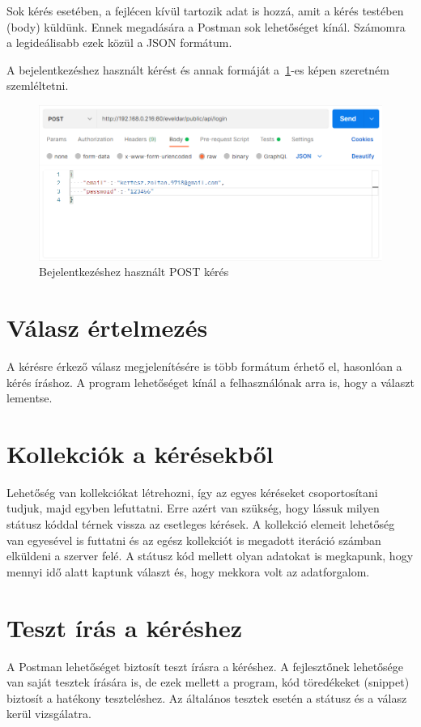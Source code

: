 \documentclass[
]{thesis-ekf}
\theoremstyle{definition}
\theoremstyle{remark}
\begin{document}
	Sok kérés esetében, a fejlécen kívül tartozik adat is hozzá, amit a kérés testében (body) küldünk. Ennek megadására a Postman sok lehetőséget kínál. Számomra a legideálisabb ezek közül a JSON formátum. 
	
	A bejelentkezéshez használt kérést és annak formáját a~\ref{figure:postman_login}-es képen szeretném szemléltetni. 
	
	\begin{figure}[ht!]
		\centering
		\includegraphics[width=1\textwidth]{postman/login_post}
		\caption{Bejelentkezéshez használt POST kérés}
		\label{figure:postman_login}
	\end{figure}
	
	\section{Válasz értelmezés}
	A kérésre érkező válasz megjelenítésére is több formátum érhető el, hasonlóan a kérés íráshoz. A program lehetőséget kínál a felhasználónak arra is, hogy a választ lementse.
	
	\section{Kollekciók a kérésekből}
	Lehetőség van kollekciókat létrehozni, így az egyes kéréseket csoportosítani tudjuk, majd egyben lefuttatni. Erre azért van szükség, hogy lássuk milyen státusz kóddal térnek vissza az esetleges kérések. A kollekció elemeit lehetőség van egyesével is futtatni és az egész kollekciót is megadott iteráció számban elküldeni a szerver felé. A státusz kód mellett olyan adatokat is megkapunk, hogy mennyi idő alatt kaptunk választ és, hogy mekkora volt az adatforgalom. 
	
	\section{Teszt írás a kéréshez}
	A Postman lehetőséget biztosít teszt írásra a kéréshez. A fejlesztőnek lehetősége van saját tesztek írására is, de ezek mellett a program, kód töredékeket (snippet) biztosít a hatékony teszteléshez. Az általános tesztek esetén a státusz és a válasz kerül vizsgálatra. 
	
\end{document}
